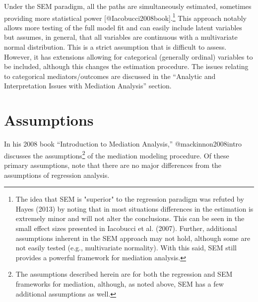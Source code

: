 \documentclass[]{article}
\let\rmarkdownfootnote\footnote%
\def\footnote{\protect\rmarkdownfootnote}
\begin{document}
Under the SEM paradigm, all the paths are simultaneously estimated,
sometimes providing more statistical power
{[}@Iacobucci2008book{]}.\footnote{The idea that SEM is "superior" to the regression paradigm was refuted by Hayes (2013) by noting that in most situations differences in the estimation is extremely minor and will not alter the conclusions. This can be seen in the small effect sizes presented in Iacobucci et al. (2007). Further, additional assumptions inherent in the SEM approach may not hold, although some are not easily tested (e.g., multivariate normality). With this said, SEM still provides a powerful framework for mediation analysis.}
This approach notably allows more testing of the full model fit and can
easily include latent variables but assumes, in general, that all
variables are continuous with a multivariate normal distribution. This
is a strict assumption that is difficult to assess. However, it has
extensions allowing for categorical (generally ordinal) variables to be
included, although this changes the estimation procedure. The issues
relating to categorical mediators/outcomes are discussed in the
``Analytic and Interpretation Issues with Mediation Analysis'' section.

\section{Assumptions}\label{assumptions}

In his 2008 book ``Introduction to Mediation Analysis,''
@mackinnon2008intro discusses the
assumptions\footnote{The assumptions described herein are for both the regression and SEM frameworks for mediation, although, as noted above, SEM has a few additional assumptions as well.}
of the mediation modeling procedure. Of these primary assumptions, note
that there are no major differences from the assumptions of regression
analysis.
\end{document}
